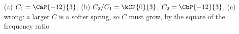 (a) $C_1 = \CaP{-12}{3}$, (b) $C_2/C_1 = \kCP{0}{3}$, $C_2 = \CbP{-12}{3}$, (c) wrong: a larger $C$ is a softer spring, so $C$ must grow, by the square of the frequency ratio

